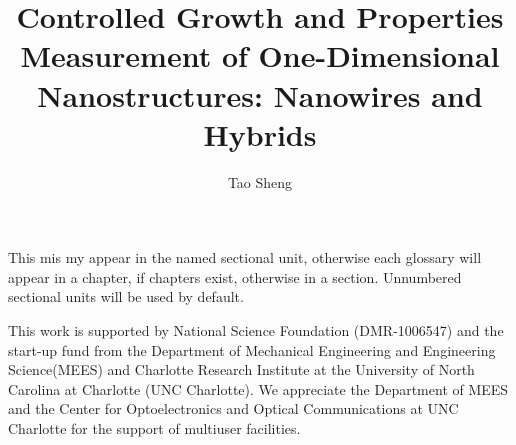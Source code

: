 
  \title{Controlled Growth and Properties Measurement of One-Dimensional Nanostructures: Nanowires and Hybrids}
  \author{Tao Sheng}
  \thesisyear{\the\year}



\maketitle




\begin{dedication}
This mis my appear in the named sectional unit, otherwise each glossary will
appear in a chapter, if chapters exist, otherwise in a section. Unnumbered
sectional units will be used by default.
\end{dedication}


\begin{ackn}
This work is supported by National Science Foundation (DMR-1006547) and the start-up fund from the Department of Mechanical Engineering and Engineering Science(MEES) and Charlotte Research Institute at the University of North Carolina at Charlotte (UNC Charlotte). We appreciate the Department of MEES and the Center for Optoelectronics and Optical Communications at UNC Charlotte for the support of multiuser facilities.
\end{ackn}
\setcounter{tocdepth}{1}

\clearpage
\tableofcontents
\clearpage
\listoftables
\clearpage
\listoffigures
\begin{singlespace}
\renewcommand{\glossarypreamble}{\thispagestyle{myheadings}}
\renewcommand{\acronymname}{LIST OF ABBREVIATIONS}
\printglossary[type=\acronymtype]
\clearpage
\end{singlespace}


\pagebreak{} 